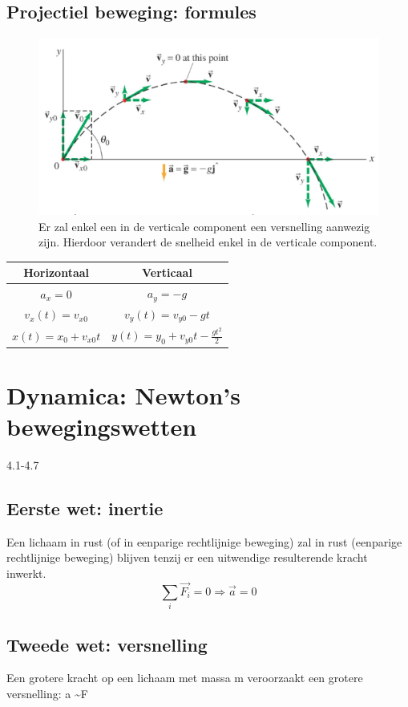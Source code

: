 \documentclass[12pt,a4paper]{article}
\begin{document}
	\subsection{Projectiel beweging: formules}
	\begin{figure}[h]
		\centering
		\includegraphics[width=0.7\linewidth]{projectiel}
		\caption{Er zal enkel een in de verticale component een versnelling aanwezig zijn. Hierdoor verandert de snelheid enkel in de verticale component.}
		\label{projectiel}
	\end{figure}
\begin{table}[h]
	\centering
	\begin{tabular}{|c|c|}
		\hline
		\textbf{Horizontaal} & \textbf{Verticaal} \\
		\hline
		\(a_x = 0\)&\(a_y = -g\)  \\
		\hline
		\(v_x(t) = v_{x0}\)&\(v_y(t) = v_{y0} - gt\)  \\
		\hline
		\(x(t) = x_0 + v_{x0}t\)&\(y(t) = y_0 + v_{y0}t - \frac{gt^2}{2}\)  \\
		\hline
	\end{tabular}
\end{table}
	\section{Dynamica: Newton's bewegingswetten}
	4.1-4.7
	\subsection{Eerste wet: inertie}
	Een lichaam in rust (of in eenparige rechtlijnige beweging) zal in rust (eenparige rechtlijnige beweging) blijven tenzij er een uitwendige resulterende kracht inwerkt.
	\[\sum_{i}\overrightarrow{F_i} = 0 \Rightarrow \overrightarrow{a} = 0\]
	\subsection{Tweede wet: versnelling}
	Een grotere kracht op een lichaam met massa m veroorzaakt een grotere versnelling: a \textasciitilde F
	
\end{document}
